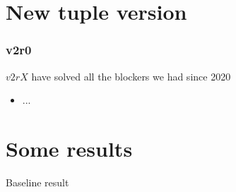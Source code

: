\documentclass[9pt,xcolor={table,svgnames},aspectratio=43]{beamer}
\makeatletter
\newcommand{\TupleVersion}{v3r0@LcosK}
\newcommand{\TupleVersionOriginal}{v3r0}
\newcommand{\TABLES}{/home3/marcos.romero/phis-scq.git/16-welcome-lera/output/tables}
\makeatother
\begin{document}



\begin{frame}
  \maketitle
\end{frame}





\section{New tuple version}


\begin{frame}
\frametitle{v2r0}

$v2rX$ have solved all the blockers we had since 2020

\begin{itemize}
	\item ...
\end{itemize}

\end{frame}




\section{Some results}


\begin{frame}{Baseline result}

	  \small
    \centering
    

\end{frame}


%
%     
%
%
%
%
%     
%
\end{document}
